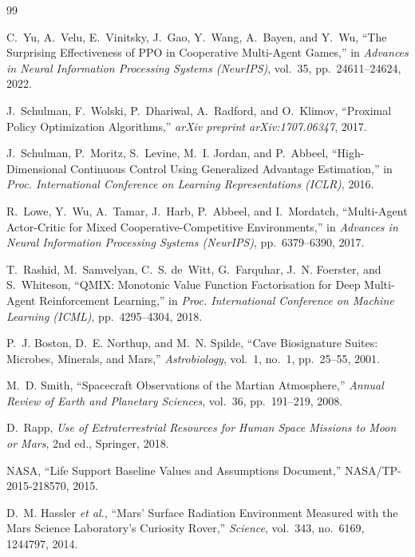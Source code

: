 \documentclass[11pt,a4paper]{ctexart}
\begin{document}
\begin{thebibliography}{99}

C.~Yu, A.~Velu, E.~Vinitsky, J.~Gao, Y.~Wang, A.~Bayen, and Y.~Wu,
``The Surprising Effectiveness of PPO in Cooperative Multi-Agent Games,''
in \textit{Advances in Neural Information Processing Systems (NeurIPS)}, vol.~35, pp.~24611--24624, 2022.

J.~Schulman, F.~Wolski, P.~Dhariwal, A.~Radford, and O.~Klimov,
``Proximal Policy Optimization Algorithms,''
\textit{arXiv preprint arXiv:1707.06347}, 2017.

J.~Schulman, P.~Moritz, S.~Levine, M.~I. Jordan, and P.~Abbeel,
``High-Dimensional Continuous Control Using Generalized Advantage Estimation,''
in \textit{Proc. International Conference on Learning Representations (ICLR)}, 2016.

R.~Lowe, Y.~Wu, A.~Tamar, J.~Harb, P.~Abbeel, and I.~Mordatch,
``Multi-Agent Actor-Critic for Mixed Cooperative-Competitive Environments,''
in \textit{Advances in Neural Information Processing Systems (NeurIPS)}, pp.~6379--6390, 2017.

T.~Rashid, M.~Samvelyan, C.~S. de~Witt, G.~Farquhar, J.~N. Foerster, and S.~Whiteson,
``QMIX: Monotonic Value Function Factorisation for Deep Multi-Agent Reinforcement Learning,''
in \textit{Proc. International Conference on Machine Learning (ICML)}, pp.~4295--4304, 2018.

P.~J. Boston, D.~E. Northup, and M.~N. Spilde,
``Cave Biosignature Suites: Microbes, Minerals, and Mars,''
\textit{Astrobiology}, vol.~1, no.~1, pp.~25--55, 2001.

M.~D. Smith,
``Spacecraft Observations of the Martian Atmosphere,''
\textit{Annual Review of Earth and Planetary Sciences}, vol.~36, pp.~191--219, 2008.

D.~Rapp,
\textit{Use of Extraterrestrial Resources for Human Space Missions to Moon or Mars},
2nd ed., Springer, 2018.

NASA,
``Life Support Baseline Values and Assumptions Document,''
NASA/TP-2015-218570, 2015.

D.~M. Hassler \textit{et al.},
``Mars' Surface Radiation Environment Measured with the Mars Science Laboratory's Curiosity Rover,''
\textit{Science}, vol.~343, no.~6169, 1244797, 2014.


\end{thebibliography}
\end{document}
